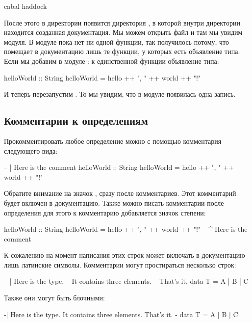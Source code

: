 \begin{code}
cabal haddock
\end{code}

После этого в директории  появится директория
, в которой внутри директории  находится
созданная документация. Мы можем открыть файл 
и там мы увидим  модуля. В модуле пока
нет ни одной функции, так получилось потому, что 
помещает в документацию лишь те функции, у которых есть 
объявление типа. Если мы добавим в модуле :
к единственной функции объявление типа:

\begin{code}
helloWorld :: String
helloWorld = hello ++ ", " ++ world ++ "!"
\end{code}

И теперь перезапустим . То мы увидим, что
в модуле   появилась одна запись. 

\subsection{Комментарии к определениям}

Прокомментировать любое определение можно с помощью
комментария следующего вида:

\begin{code}
-- | Here is the comment
helloWorld :: String
helloWorld = hello ++ ", " ++ world ++ "!"
\end{code}

Обратите внимание на значок , сразу после
комментариев. Этот комментарий будет включен в документацию.
Также можно писать комментарии после определения для этого
к комментарию добавляется значок степени:

\begin{code}
helloWorld :: String
helloWorld = hello ++ ", " ++ world ++ "!"
-- ^ Here is the comment
\end{code}

К сожалению на момент написания этих строк 
может включать в документацию лишь латинские символы.
Комментарии могут простираться несколько строк:


\begin{code}
-- | Here is the type.
-- It contains three elements.
-- That's it.
data T = A | B | C
\end{code}

Также они могут быть блочными:

\begin{code}
{-|
   Here is the type.
   It contains three elements.
   That's it.
 -}
data T = A | B | C
\end{code}

